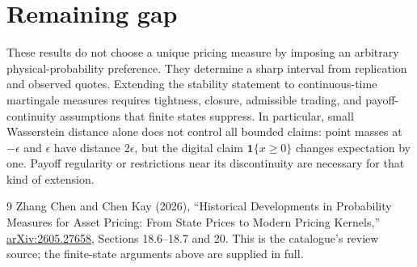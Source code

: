 \documentclass[11pt,a4paper]{article}
\theoremstyle{remark}
\newcommand{\ind}{\mathbf 1}
\begin{document}
\section{Remaining gap}
These results do not choose a unique pricing measure by imposing an arbitrary physical-probability preference. They determine a sharp interval from replication and observed quotes. Extending the stability statement to continuous-time martingale measures requires tightness, closure, admissible trading, and payoff-continuity assumptions that finite states suppress. In particular, small Wasserstein distance alone does not control all bounded claims: point masses at $-\epsilon$ and $\epsilon$ have distance $2\epsilon$, but the digital claim $\ind\{x\ge0\}$ changes expectation by one. Payoff regularity or restrictions near its discontinuity are necessary for that kind of extension.

\begin{thebibliography}{9}
 Zhang Chen and Chen Kay (2026), ``Historical Developments in Probability Measures for Asset Pricing: From State Prices to Modern Pricing Kernels,'' \href{https://arxiv.org/abs/2605.27658}{arXiv:2605.27658}, Sections 18.6--18.7 and 20. This is the catalogue's review source; the finite-state arguments above are supplied in full.
\end{thebibliography}
\end{document}
